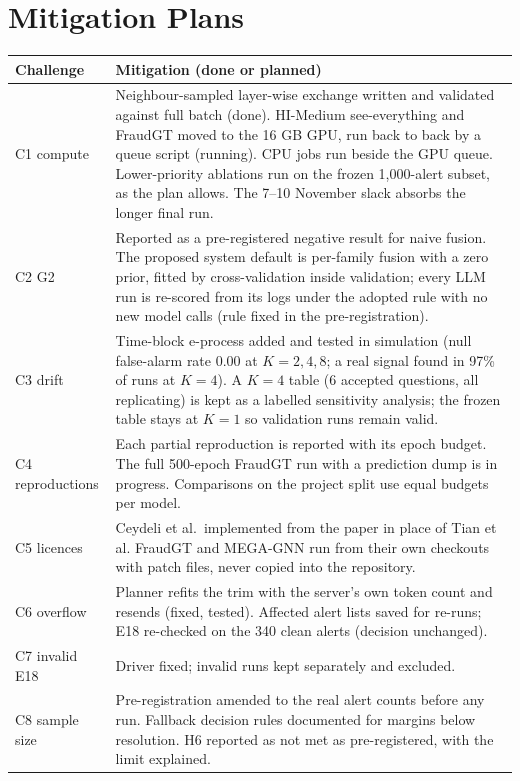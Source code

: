\documentclass[11pt,a4paper]{article}
\begin{document}
\section{Mitigation Plans}
\label{sec:mitigation}

\begin{table}[!htbp]
\centering\small
\begin{tabularx}{\textwidth}{@{}lL@{}}
\toprule
Challenge & Mitigation (done or planned) \\
\midrule
C1 compute & Neighbour-sampled layer-wise exchange written and validated against full batch (done). HI-Medium see-everything and FraudGT moved to the 16 GB GPU, run back to back by a queue script (running). CPU jobs run beside the GPU queue. Lower-priority ablations run on the frozen 1,000-alert subset, as the plan allows. The 7--10 November slack absorbs the longer final run. \\
C2 G2 & Reported as a pre-registered negative result for naive fusion. The proposed system default is per-family fusion with a zero prior, fitted by cross-validation inside validation; every LLM run is re-scored from its logs under the adopted rule with no new model calls (rule fixed in the pre-registration). \\
C3 drift & Time-block e-process added and tested in simulation (null false-alarm rate 0.00 at $K=2,4,8$; a real signal found in 97\% of runs at $K=4$). A $K=4$ table (6 accepted questions, all replicating) is kept as a labelled sensitivity analysis; the frozen table stays at $K=1$ so validation runs remain valid. \\
C4 reproductions & Each partial reproduction is reported with its epoch budget. The full 500-epoch FraudGT run with a prediction dump is in progress. Comparisons on the project split use equal budgets per model. \\
C5 licences & Ceydeli et al.\ implemented from the paper in place of Tian et al. FraudGT and MEGA-GNN run from their own checkouts with patch files, never copied into the repository. \\
C6 overflow & Planner refits the trim with the server's own token count and resends (fixed, tested). Affected alert lists saved for re-runs; E18 re-checked on the 340 clean alerts (decision unchanged). \\
C7 invalid E18 & Driver fixed; invalid runs kept separately and excluded. \\
C8 sample size & Pre-registration amended to the real alert counts before any run. Fallback decision rules documented for margins below resolution. H6 reported as not met as pre-registered, with the limit explained. \\

\end{tabularx}
\end{table}
\end{document}
